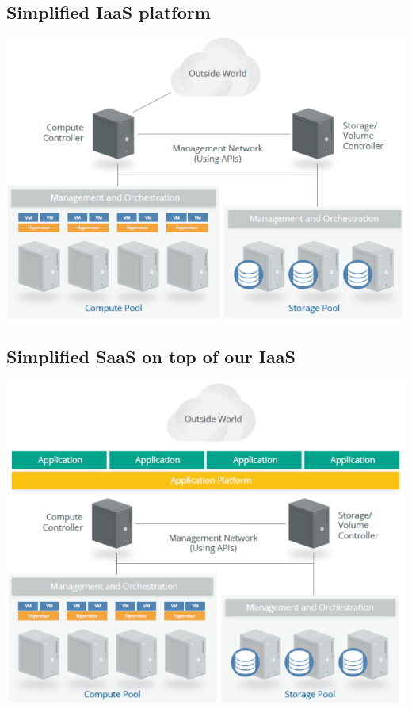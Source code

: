 \documentclass[a4]{article}
\begin{document}
\begin{multicols}{3}
\subsection{Simplified IaaS platform}
\begin{center}
    \includegraphics[width=\columnwidth]{cloud-simplified-iaas.png}
\end{center}

\subsection{Simplified SaaS on top of our IaaS}
\begin{center}
    \includegraphics[width=\columnwidth]{cloud-simplified-saas.png}
\end{center}



\end{multicols}
\end{document}
